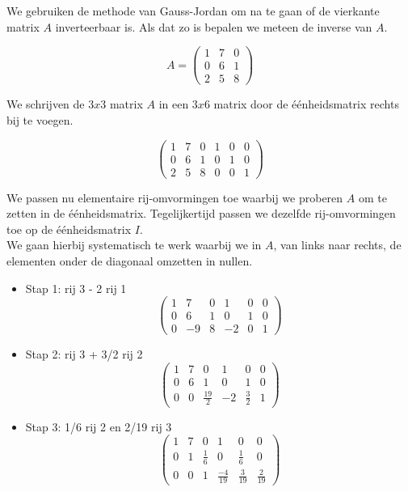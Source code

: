 \begin{voorbeeld}
	We gebruiken de methode van Gauss-Jordan om na te gaan of de vierkante matrix $A$ inverteerbaar is. Als dat zo is bepalen we meteen de inverse van $A$.

\[ A=\left( \begin{matrix}
1 & 7 & 0 \\
0 & 6 & 1 \\
2 & 5 & 8
\end{matrix} \right)   \]

We schrijven de $3x3$ matrix $A$ in een $3x6$ matrix door de \'{e}\'{e}nheidsmatrix rechts bij te voegen.

\[ \left( \begin{matrix}
1 & 7 & 0 & 1 & 0 & 0 \\
0 & 6 & 1 & 0 & 1 & 0 \\
2 & 5 & 8 & 0 & 0 & 1 \end{matrix} \right) 
\] 

We passen nu elementaire rij-omvormingen toe waarbij we proberen $A$ om te zetten in de \'{e}\'{e}nheidsmatrix. Tegelijkertijd passen we dezelfde rij-omvormingen toe op de \'{e}\'{e}nheidsmatrix $I$.\\
We gaan hierbij systematisch te werk waarbij we in $A$, van links naar rechts, de elementen onder de diagonaal omzetten in nullen. 

\begin{itemize}
	\item Stap 1: rij 3 - 2 rij 1 
	\[ \left( \begin{matrix}
	1 & 7 & 0 & 1 & 0 & 0 \\
	0 & 6 & 1 & 0 & 1 & 0 \\
	0 & -9 & 8 & -2 & 0 & 1 \end{matrix} \right) 
	\] 
	\item Stap 2: rij 3 + 3/2 rij 2 
	\[ \left( \begin{matrix}
	1 & 7 & 0 & 1 & 0 & 0 \\
	0 & 6 & 1 & 0 & 1 & 0 \\
	0 & 0 & \frac{19}{2} & -2 & \frac{3}{2} & 1 \end{matrix} \right) 
	\] 
	\item Stap 3: 1/6 rij 2 en 2/19 rij 3 
	\[ \left( \begin{matrix}
	1 & 7 & 0 & 1 & 0 & 0 \\
	0 & 1 & \frac{1}{6} & 0 & \frac{1}{6} & 0 \\
	0 & 0 & 1 & \frac{-4}{19} & \frac{3}{19} & \frac{2}{19} \end{matrix} \right) 
	\]
\end{itemize}


\end{voorbeeld}
